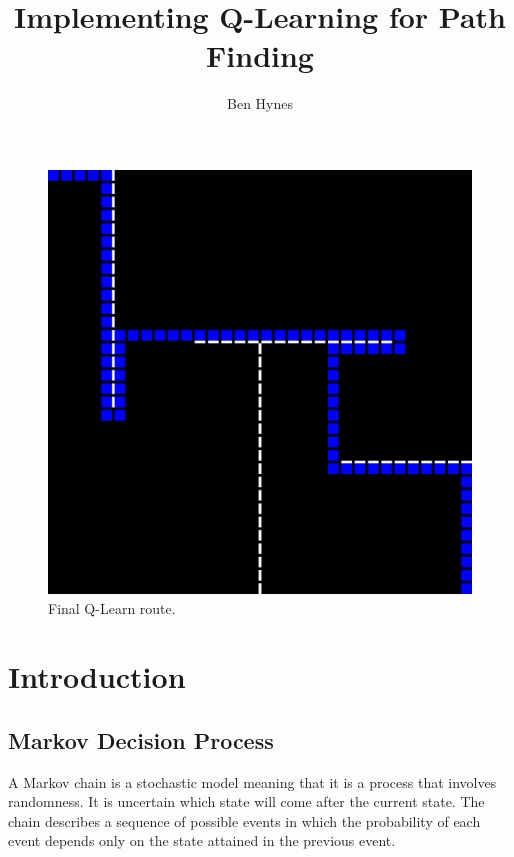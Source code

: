 \documentclass[]{article}
\title{Implementing Q-Learning for Path Finding}
\author{Ben Hynes}
\begin{document}
	
\maketitle

\begin{figure}[H]
	\includegraphics[scale=0.05]{1ma}
	\centering
	\caption{Final Q-Learn route.}
\end{figure}

\clearpage

\section{Introduction}

\subsection{Markov Decision Process}

A Markov chain is a stochastic model meaning that it is a process that involves randomness. It is uncertain which state will come after the current state. The chain describes a sequence of possible events in which the probability of each event depends only on the state attained in the previous event. 
\end{document}
